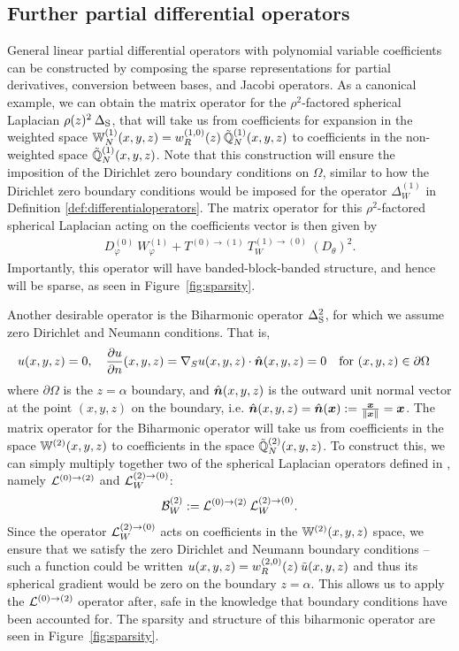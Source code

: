 \documentclass[11pt, oneside]{article}   	%
\begin{document}
\subsection{Further partial differential operators}\label{subsection:furtherdiffoperators}
General linear partial differential operators with polynomial variable coefficients can be constructed by composing the sparse representations for partial derivatives, conversion between bases, and Jacobi operators. As a canonical example, we can obtain the matrix operator for the $\rho^2$-factored spherical Laplacian $\rho(z)^2 \: \DeltaS$, that will take us from coefficients for expansion in the weighted space $\bigW_N^{(1)}(x,y,z) = \genjacw^{(1,0)}(z) \: \bigscopN^{(1)}(x,y,z)$ to coefficients in the non-weighted space $\bigscopN^{(1)}(x,y,z)$. Note that this construction will ensure the imposition of the Dirichlet zero boundary conditions on $\Omega$, similar to how the Dirichlet zero boundary conditions would be imposed for the operator $\Delta^{(1)}_W$ in Definition \ref{def:differentialoperators}. The matrix operator for this $\rho^2$-factored spherical Laplacian acting on the coefficients vector is then given by
\begin{align*}
	D_\varphi^{(0)} \: W_\varphi^{(1)} + T^{(0)\to(1)} \: T_W^{(1)\to(0)} \: (D_\theta)^2.
\end{align*}
Importantly, this operator will have banded-block-banded structure, and hence will be sparse, as seen in Figure~\ref{fig:sparsity}.

Another desirable operator is the Biharmonic operator $\DeltaS^2$, for which we assume zero Dirichlet and Neumann conditions. That is, 
\begin{align*}
	u(x,y,z) &= 0, \quad \pfpx{n}{u}(x,y,z) = \nabla_S u(x,y,z) \cdot \unitvec{n}(x,y,z) = 0 \quad \text{for } (x,y,z) \in \partial\Omega
\end{align*}
where $\partial\Omega$ is the $z=\alpha$ boundary, and $\unitvec{n}(x,y,z)$ is the outward unit normal vector at the point $(x,y,z)$ on the boundary, i.e. $\unitvec{n}(x,y,z) = \unitvec{n}(\vec x) := {\vec x \over \norm{\vec x}} = \vec x$. The matrix operator for the Biharmonic operator will take us from coefficients in the space $\bigW^{(2)}(x,y,z)$ to coefficients in the space $\bigscopN^{(2)}(x,y,z)$. To construct this, we can simply multiply together two of the spherical Laplacian operators defined in , namely $\calL^{(0)\to(2)}$ and $\calL_W^{(2)\to(0)}$:
\begin{align*}
	\calB^{(2)}_W := \calL^{(0)\to(2)} \: \calL_W^{(2)\to(0)}.
\end{align*}
Since the operator $\calL_W^{(2)\to(0)}$ acts on coefficients in the $\bigW^{(2)}(x,y,z)$ space, we ensure that we satisfy the zero Dirichlet and Neumann boundary conditions -- such a function could be written $u(x,y,z) = \genjacw^{(2,0)}(z) \: \tilde u(x,y,z)$ and thus its spherical gradient would be zero on the boundary $z = \alpha$. This allows us to apply the $\calL^{(0)\to(2)}$ operator after, safe in the knowledge that boundary conditions have been accounted for. The sparsity and structure of this biharmonic operator are seen in Figure~\ref{fig:sparsity}.
\end{document}
